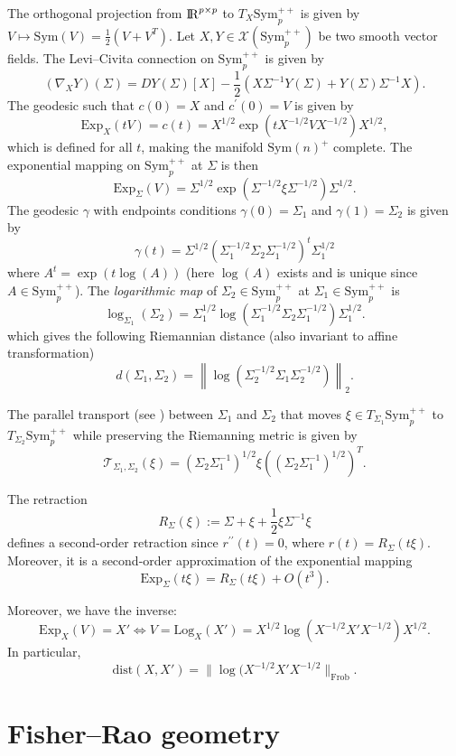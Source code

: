 \documentclass[10pt,a4paper]{book}
\theoremstyle{definition}
\theoremstyle{plain}
\theoremstyle{remark}
\newcommand \SPD {\text{Sym}(n)^{+}}
\def\R{{\rm I\kern-0.16em R}}
\begin{document}
The orthogonal projection from $\R^{p\times p}$ to $T_X\text{Sym}_p^{++}$ is given by $V\mapsto \text{Sym}(V)=\frac{1}{2}(V+V^{T})$. 
Let $X,Y\in \mathcal{X}(\text{Sym}_p^{++})$ be two smooth vector fields. The Levi--Civita connection on $\text{Sym}_p^{++}$ is given by
$$(\nabla_X Y)(\Sigma)=DY(\Sigma)[X]-\frac{1}{2}\left(X\Sigma^{-1}Y(\Sigma)+Y(\Sigma)\Sigma^{-1}X\right).$$
The geodesic such that $c(0)=X$ and $c^{\prime}(0)=V$ is given by
$$\text{Exp}_X(tV)=c(t)=X^{1/2}\exp\left(tX^{-1/2}VX^{-1/2}\right)X^{1/2},$$
which is defined for all $t$, making the manifold $\SPD$ complete. 
The exponential mapping on $\text{Sym}_p^{++}$ at $\Sigma$ is then
$$\text{Exp}_{\Sigma}(V)=\Sigma^{1/2}\exp\left(\Sigma^{-1/2}\xi \Sigma^{-1/2}\right)\Sigma^{1/2}.$$
The geodesic $\gamma$ with endpoints conditions $\gamma(0)=\Sigma_1$ and $\gamma(1)=\Sigma_2$ is given by
$$\gamma(t)=\Sigma^{1/2}\left(\Sigma_1^{-1/2}\Sigma_2\Sigma_1^{-1/2}\right)^{t}\Sigma_1^{1/2}$$
where $A^{t}=\exp(t\log(A))$ (here $\log(A)$ exists and is unique since $A\in \text{Sym}_p^{++}$). 
The \emph{logarithmic map} of $\Sigma_2\in \text{Sym}_p^{++}$ at $\Sigma_1\in \text{Sym}_{p}^{++}$ is
$$\log_{\Sigma_1}(\Sigma_2)=\Sigma_1^{1/2}\log(\Sigma_1^{-1/2}\Sigma_2\Sigma_1^{-1/2})\Sigma_1^{1/2}.$$
which gives the following Riemannian distance (also invariant to affine transformation)
$$d(\Sigma_1,\Sigma_2)=\left\|\log\left(\Sigma_2^{-1/2}\Sigma_1\Sigma_2^{-1/2}\right)\right\|_2.$$

The parallel transport (see \cite{sra2015conic}) between $\Sigma_1$ and $\Sigma_2$ that moves $\xi\in T_{\Sigma_1}\text{Sym}_p^{++}$ to $T_{\Sigma_2}\text{Sym}_p^{++}$ while preserving the Riemanning metric is given by
$$\mathcal{T}_{\Sigma_1,\Sigma_2}(\xi)=(\Sigma_2\Sigma_1^{-1})^{1/2}\xi\left((\Sigma_2\Sigma_1^{-1})^{1/2}\right)^{T}.$$

The retraction
$$R_{\Sigma}(\xi):=\Sigma+\xi+\frac{1}{2}\xi\Sigma^{-1}\xi$$
defines a second-order retraction since
$r^{\prime \prime}(t)= 0$, where $r(t)=R_{\Sigma}(t\xi)$. Moreover, it is a second-order approximation of the exponential mapping
$$\text{Exp}_{\Sigma}(t\xi)=R_{\Sigma}(t\xi)+O(t^3).$$




Moreover, we have the inverse:
$$\text{Exp}_X(V)=X' \iff V= \text{Log}_X(X')= X^{1/2}\log(X^{-1/2}X'X^{-1/2})X^{1/2}.$$
In particular,
$$\text{dist}(X,X')=\|\log(X^{-1/2}X'X^{-1/2}\|_{\text{Frob}}.$$



\chapter{Fisher--Rao geometry}
\end{document}

